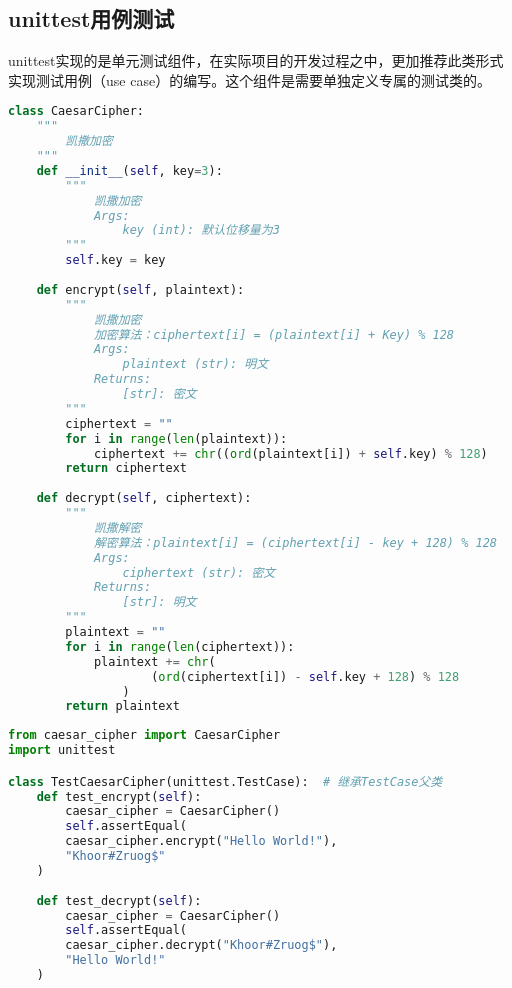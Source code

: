 \vspace{0.5cm}

\subsection{unittest用例测试}

unittest实现的是单元测试组件，在实际项目的开发过程之中，更加推荐此类形式实现测试用例（use case）的编写。这个组件是需要单独定义专属的测试类的。\\


\begin{lstlisting}[language=Python, title=caesar\_cipher.py]
class CaesarCipher:
    """
        凯撒加密
    """
    def __init__(self, key=3):
        """
            凯撒加密
            Args:
                key (int): 默认位移量为3
        """
        self.key = key
    
    def encrypt(self, plaintext):
        """
            凯撒加密
            加密算法：ciphertext[i] = (plaintext[i] + Key) % 128
            Args:
                plaintext (str): 明文
            Returns:
                [str]: 密文
        """
        ciphertext = ""
        for i in range(len(plaintext)):
            ciphertext += chr((ord(plaintext[i]) + self.key) % 128)
        return ciphertext
    
    def decrypt(self, ciphertext):
        """
            凯撒解密
            解密算法：plaintext[i] = (ciphertext[i] - key + 128) % 128
            Args:
                ciphertext (str): 密文
            Returns:
                [str]: 明文
        """
        plaintext = ""
        for i in range(len(ciphertext)):
            plaintext += chr(
                    (ord(ciphertext[i]) - self.key + 128) % 128
                )
        return plaintext
\end{lstlisting}

\begin{lstlisting}[language=Python, title=test\_caesar\_cipher.py]
from caesar_cipher import CaesarCipher
import unittest

class TestCaesarCipher(unittest.TestCase):  # 继承TestCase父类
    def test_encrypt(self):
        caesar_cipher = CaesarCipher()
        self.assertEqual(
        caesar_cipher.encrypt("Hello World!"), 
        "Khoor#Zruog$"
    )
    
    def test_decrypt(self):
        caesar_cipher = CaesarCipher()
        self.assertEqual(
        caesar_cipher.decrypt("Khoor#Zruog$"),
        "Hello World!"
    )
\end{lstlisting}


